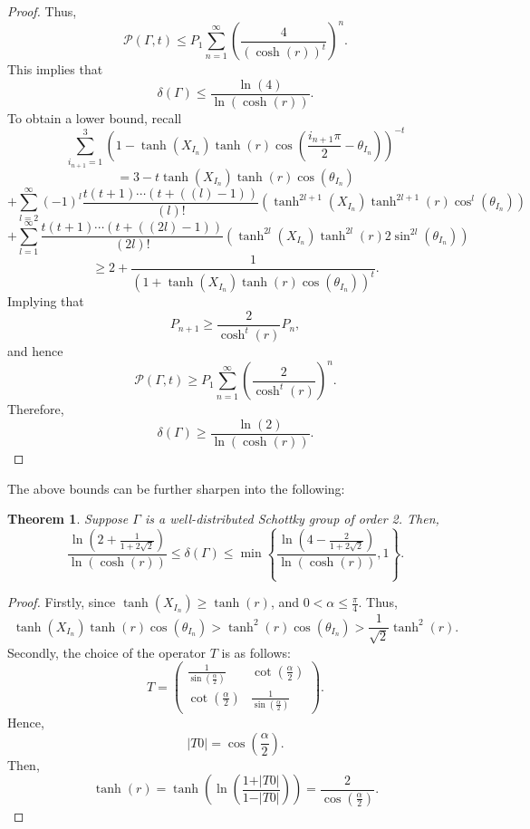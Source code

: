 \documentclass[12pt,oneside]{sfsuthesis}
\theoremstyle{plain} %
\newtheorem{theorem}{Theorem}[chapter]
\theoremstyle{definition}  %
\theoremstyle{remark}  %
\theoremstyle{plain}
\begin{document}
{\begin{proof}
Thus,
$$
\mathcal{P}\left(\Gamma,t\right)\leq P_1\sum_{n=1}^\infty\left(\frac{4}{(\cosh\left(r\right))^t}\right)^n.
$$
This implies that
$$
\delta\left(\Gamma\right)\leq \frac{\ln\left(4\right)}{\ln\left(\cosh\left(r\right)\right)}.
$$
To obtain a lower bound, recall
$$
\sum_{i_{n+1}=1}^{3}\left(1-\tanh\left(X_{I_n}\right)\tanh\left(r\right)\cos\left(\frac{i_{n+1}\pi}{2}-\theta_{I_{n}}\right)\right)^{-t}
$$
$$
=3-t\tanh\left(X_{I_n} \right)\tanh\left(r\right)\cos\left(\theta_{I_n}\right)
$$
$$
+\sum_{l=2}^{\infty}(-1)^l\frac{t\left(t+1\right)\cdots\left(t+\left((l)-1\right)\right)}{\left(l\right)!}
\left( 
\tanh^{2l+1}\left(X_{I_n}\right)\tanh^{2l+1}\left(r\right)\cos^{l}\left(\theta_{I_n}\right)
\right)
$$
$$
+\sum_{l=1}^{\infty}\frac{t\left(t+1\right)\cdots\left(t+\left((2l)-1\right)\right)}{\left(2l\right)!}
\left( 
\tanh^{2l}\left(X_{I_n}\right)\tanh^{2l}\left(r\right)2\sin^{2l}\left(\theta_{I_n}\right)
\right)
$$
$$
\geq 2+\frac{1}{\left(1+\tanh\left(X_{I_n}\right)\tanh\left(r\right)\cos\left(\theta_{I_n}\right)\right)^t}.
$$
Implying that
$$
P_{n+1}\geq \frac{2}{\cosh^t\left(r\right)}P_n,
$$
and hence
$$
\mathcal{P}\left(\Gamma,t\right) \geq P_1\sum_{n=1}^\infty\left(\frac{2}{\cosh^t\left(r\right)}\right)^n.
$$
Therefore, 
$$
\delta\left(\Gamma\right)\geq \frac{\ln\left(2\right)}{\ln\left(\cosh\left(r\right)\right)}.
$$
\end{proof}
The above bounds can be further sharpen into the following:
\begin{theorem}\label{main thm 11}
Suppose $\Gamma$ is a well-distributed Schottky group of order 2. Then, 
$$
\frac{\ln\left( 2+\frac{1}{1+2\sqrt{2}}\right)}{\ln\left(\cosh\left(r\right)\right)}\leq \delta\left(\Gamma\right)\leq
\min\left\lbrace \frac{\ln\left(4-\frac{2}{1+2\sqrt{2}}\right)}{\ln\left(\cosh\left(r\right)\right)},1\right\rbrace.
$$
\end{theorem}
\begin{proof}
Firstly, since $\tanh\left(X_{I_n}\right)\geq \tanh\left(r\right)$, and $0<\alpha\leq\frac{\pi}{4}$. Thus,
$$
\tanh\left(X_{I_n}\right)\tanh\left(r\right)\cos\left(\theta_{I_n}\right)>\tanh^2\left(r\right)\cos\left(\theta_{I_n}\right)>\frac{1}{\sqrt{2}}\tanh^2\left(r\right).
$$
Secondly, the choice of the operator $T$ is as follows:
$$
T=\begin{pmatrix}
\frac{1}{\sin\left(\frac{\alpha}{2}\right)} &  \cot\left(\frac{\alpha}{2}\right) \\
\cot\left(\frac{\alpha}{2}\right) &  \frac{1}{\sin\left(\frac{\alpha}{2}\right)}
\end{pmatrix}.
$$
Hence, 
$$\vert T0\vert=\cos\left(\frac{\alpha}{2}\right).$$
Then, 
$$
\tanh\left(r\right)=\tanh\left(\ln\left(\frac{1+\vert T0\vert}{1-\vert T0\vert}\right)\right)=\frac{2}{\cos\left(\frac{\alpha}{2}\right)}.
$$


\end{proof}}
\end{document}
